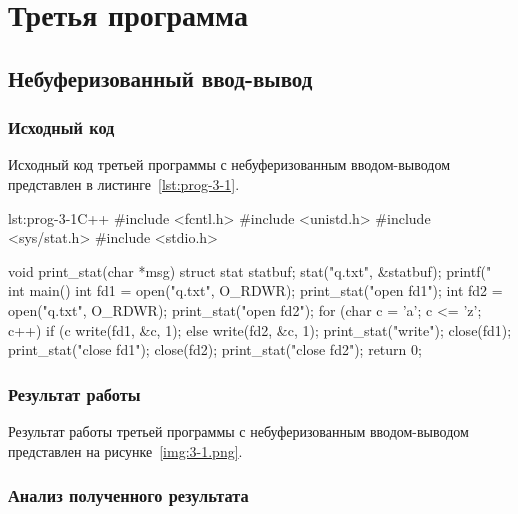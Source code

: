\section{Третья программа}
\subsection{Небуферизованный ввод-вывод}
\subsubsection{Исходный код}
Исходный код третьей программы с небуферизованным вводом-выводом 
представлен в листинге~\ref{lst:prog-3-1}.

\begin{listing}{lst:prog-3-1}{C++}
#include <fcntl.h>
#include <unistd.h>
#include <sys/stat.h>
#include <stdio.h>

void print_stat(char *msg) 
{
    struct stat statbuf;
    stat("q.txt", &statbuf);
    printf("%
}
int main() 
{
    int fd1 = open("q.txt", O_RDWR);
    print_stat("open fd1");
    int fd2 = open("q.txt", O_RDWR);
    print_stat("open fd2");
    for (char c = 'a'; c <= 'z'; c++) 
    {
        if (c %
            write(fd1, &c, 1);
        else
            write(fd2, &c, 1);
        print_stat("write");
    }
    close(fd1);
    print_stat("close fd1");
    close(fd2);
    print_stat("close fd2");
    return 0;
}
\end{listing}

\subsubsection{Результат работы}
Результат работы третьей программы с небуферизованным вводом-выводом
представлен на рисунке~\ref{img:3-1.png}.

\subsubsection{Анализ полученного результата}

